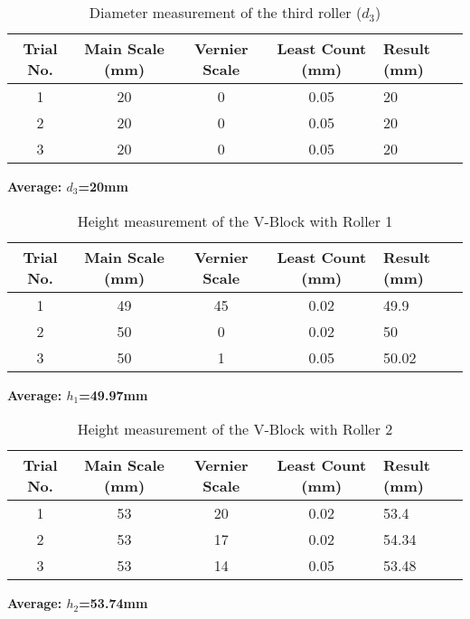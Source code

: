\documentclass[12pt]{article}
\begin{document}
\begin{table}[H]
	\centering
	\caption{Diameter measurement of the third roller ($d_3$)}
	\begin{tabularx}{\textwidth}{ccccX}
		\toprule
		\textbf{Trial No.} & \textbf{Main Scale (mm)} & \textbf{Vernier Scale} & \textbf{Least Count (mm)} & \textbf{Result (mm)} \\
		\midrule
		1                  & 20                       & 0                      & 0.05                      & 20                   \\
		2                  & 20                       & 0                      & 0.05                      & 20                   \\
		3                  & 20                       & 0                      & 0.05                      & 20                   \\
		\bottomrule
	\end{tabularx}
\end{table}
\textbf{Average: $d_3$=20mm}


\begin{table}[H]
	\centering
	\caption{Height measurement of the V-Block with Roller 1}
	\begin{tabularx}{\textwidth}{ccccX}
		\toprule
		\textbf{Trial No.} & \textbf{Main Scale (mm)} & \textbf{Vernier Scale} & \textbf{Least Count (mm)} & \textbf{Result (mm)} \\
		\midrule
		1                  & 49                       & 45                     & 0.02                      & 49.9                 \\
		2                  & 50                       & 0                      & 0.02                      & 50                   \\
		3                  & 50                       & 1                      & 0.05                      & 50.02                \\
		\bottomrule
	\end{tabularx}
\end{table}
\textbf{Average: $h_1$=49.97mm}

\begin{table}[H]
	\centering
	\caption{Height measurement of the V-Block with Roller 2}
	\begin{tabularx}{\textwidth}{ccccX}
		\toprule
		\textbf{Trial No.} & \textbf{Main Scale (mm)} & \textbf{Vernier Scale} & \textbf{Least Count (mm)} & \textbf{Result (mm)} \\
		\midrule
		1                  & 53                       & 20                     & 0.02                      & 53.4                 \\
		2                  & 53                       & 17                     & 0.02                      & 54.34                \\
		3                  & 53                       & 14                     & 0.05                      & 53.48                \\
		\bottomrule
	\end{tabularx}
\end{table}
\textbf{Average: $h_2$=53.74mm}
\end{document}
